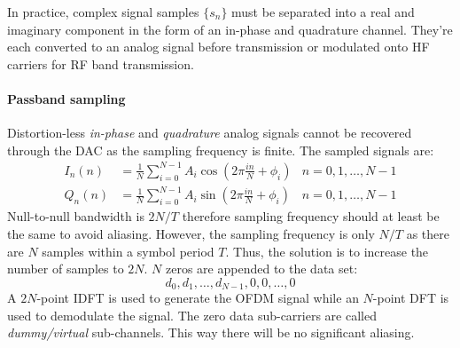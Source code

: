 In practice, complex signal samples \(\{s_n\}\) must be separated into a real and imaginary component in the form of an in-phase and quadrature channel. They're each converted to an analog signal before transmission or modulated onto \gls{HF} carriers for \gls{RF} band transmission.
\paragraph{Passband sampling} Distortion-less \emph{in-phase} and \emph{quadrature} analog signals cannot be recovered through the \gls{DAC} as the sampling frequency is finite. The sampled signals are:
\begin{align}
	I_n(n) &= \frac{1}{N}\sum_{i=0}^{N-1} A_i\cos \left( 2\pi \frac{in}{N} + \phi_i\right) & n = 0,1,\ldots,N-1 \\
	Q_n(n) &= \frac{1}{N}\sum_{i=0}^{N-1} A_i\sin \left( 2\pi \frac{in}{N} + \phi_i\right) & n = 0,1,\ldots,N-1
\end{align}
Null-to-null bandwidth is \(2N/T\) therefore sampling frequency should at least be the same to avoid aliasing. However, the sampling frequency is only \(N/T\) as there are \(N\) samples within a symbol period \(T\). Thus, the solution is to increase the number of samples to \(2N\). \(N\) zeros are appended to the data set:
\begin{equation}
	d_0, d_1, \ldots, d_{N-1}, 0, 0, \ldots, 0
\end{equation}
A \(2N\)-point \gls{IDFT} is used to generate the \gls{OFDM} signal while an \(N\)-point \gls{DFT} is used to demodulate the signal. The zero data sub-carriers are called \emph{dummy/virtual} sub-channels. This way there will be no significant aliasing.
